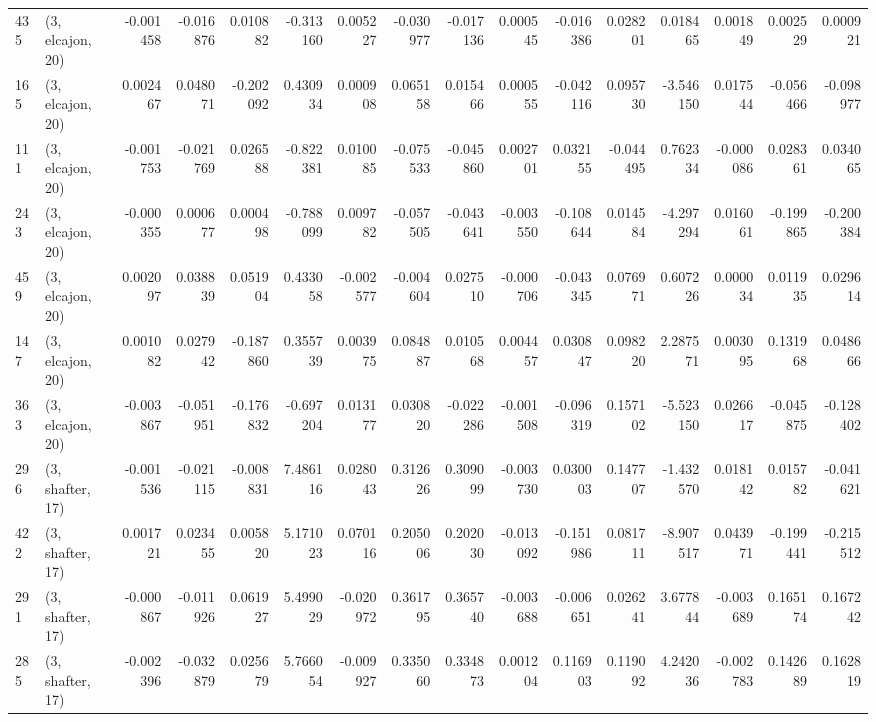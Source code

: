 \begin{tabular}{llrrrrrrrrrrrrrr}
435 &  (3, elcajon, 20) &  -0.001458 & -0.016876 &  0.010882 &   -0.313160 &  0.005227 &  -0.030977 & -0.017136 &  0.000545 & -0.016386 &  0.028201 &    0.018465 &  0.001849 &  0.002529 &  0.000921 \\
165 &  (3, elcajon, 20) &   0.002467 &  0.048071 & -0.202092 &    0.430934 &  0.000908 &   0.065158 &  0.015466 &  0.000555 & -0.042116 &  0.095730 &   -3.546150 &  0.017544 & -0.056466 & -0.098977 \\
111 &  (3, elcajon, 20) &  -0.001753 & -0.021769 &  0.026588 &   -0.822381 &  0.010085 &  -0.075533 & -0.045860 &  0.002701 &  0.032155 & -0.044495 &    0.762334 & -0.000086 &  0.028361 &  0.034065 \\
243 &  (3, elcajon, 20) &  -0.000355 &  0.000677 &  0.000498 &   -0.788099 &  0.009782 &  -0.057505 & -0.043641 & -0.003550 & -0.108644 &  0.014584 &   -4.297294 &  0.016061 & -0.199865 & -0.200384 \\
459 &  (3, elcajon, 20) &   0.002097 &  0.038839 &  0.051904 &    0.433058 & -0.002577 &  -0.004604 &  0.027510 & -0.000706 & -0.043345 &  0.076971 &    0.607226 &  0.000034 &  0.011935 &  0.029614 \\
147 &  (3, elcajon, 20) &   0.001082 &  0.027942 & -0.187860 &    0.355739 &  0.003975 &   0.084887 &  0.010568 &  0.004457 &  0.030847 &  0.098220 &    2.287571 &  0.003095 &  0.131968 &  0.048666 \\
363 &  (3, elcajon, 20) &  -0.003867 & -0.051951 & -0.176832 &   -0.697204 &  0.013177 &   0.030820 & -0.022286 & -0.001508 & -0.096319 &  0.157102 &   -5.523150 &  0.026617 & -0.045875 & -0.128402 \\
296 &  (3, shafter, 17) &  -0.001536 & -0.021115 & -0.008831 &    7.486116 &  0.028043 &   0.312626 &  0.309099 & -0.003730 &  0.030003 &  0.147707 &   -1.432570 &  0.018142 &  0.015782 & -0.041621 \\
422 &  (3, shafter, 17) &   0.001721 &  0.023455 &  0.005820 &    5.171023 &  0.070116 &   0.205006 &  0.202030 & -0.013092 & -0.151986 &  0.081711 &   -8.907517 &  0.043971 & -0.199441 & -0.215512 \\
291 &  (3, shafter, 17) &  -0.000867 & -0.011926 &  0.061927 &    5.499029 & -0.020972 &   0.361795 &  0.365740 & -0.003688 & -0.006651 &  0.026241 &    3.677844 & -0.003689 &  0.165174 &  0.167242 \\
285 &  (3, shafter, 17) &  -0.002396 & -0.032879 &  0.025679 &    5.766054 & -0.009927 &   0.335060 &  0.334873 &  0.001204 &  0.116903 &  0.119092 &    4.242036 & -0.002783 &  0.142689 &  0.162819 \\

\end{tabular}
